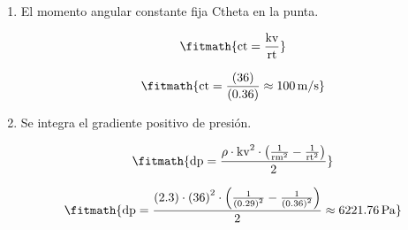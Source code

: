 \begin{enumerate}

\item El momento angular constante fija Ctheta en la punta.

\[\fitmath{\mathrm{ct}=\frac{\mathrm{kv}}{\mathrm{rt}}}\]

\[\fitmath{\mathrm{ct}=\frac{(36)}{(0.36)}\approx 100\,\mathrm{m/s}}\]

\item Se integra el gradiente positivo de presión.

\[\fitmath{\mathrm{dp}=\frac{\rho\cdot {\mathrm{kv}}^{2}\cdot \left(\frac{1}{{\mathrm{rm}}^{2}}-\frac{1}{{\mathrm{rt}}^{2}}\right)}{2}}\]

\[\fitmath{\mathrm{dp}=\frac{(2.3)\cdot {(36)}^{2}\cdot \left(\frac{1}{{(0.29)}^{2}}-\frac{1}{{(0.36)}^{2}}\right)}{2}\approx 6221.76\,\mathrm{Pa}}\]

\end{enumerate}

